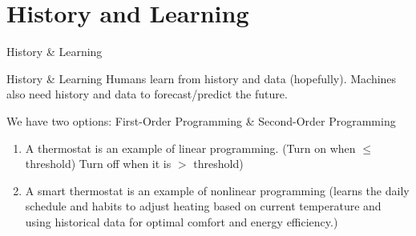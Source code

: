 \documentclass[xetex,notheorems,hyperref={pdfpagelabels=true},xcolor=table]{beamer}
\theoremstyle{plain}
\theoremstyle{definition}
\theoremstyle{example}
\theoremstyle{example}
\begin{document}
\section{History and Learning}
\begin{frame}{History \& Learning}
\begin{block}{History \& Learning}
Humans learn from history and data (hopefully). Machines also need history and data to forecast/predict the future.
\end{block}
We have two options: First-Order Programming \& Second-Order Programming
    \begin{figure}[h]
  \centering
\end{figure}
\begin{enumerate}
    \item A thermostat is an example of linear programming. (Turn on when $\leq$ threshold) Turn off when it is $>$ threshold)
    \item A smart thermostat is an example of nonlinear programming (learns the daily schedule and habits to adjust heating based on current temperature and using historical data for optimal comfort and energy efficiency.)
\end{enumerate}
\end{frame}
\end{document}
